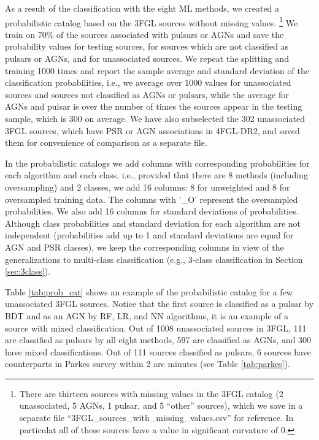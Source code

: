 As a result of the classification with the eight ML methods,
we created a probabilistic catalog based on the 3FGL sources without missing values.%
\footnote{There are thirteen sources with missing values in the 3FGL catalog (2 unassociated, 5 AGNs, 1 pulsar, and 5 ``other'' sources), 
which we save in a separate file ``3FGL\_sources\_with\_missing\_values.csv'' for reference. In particulat all of these sources have a value in significant curvature of 0.
}
We train on 70\% of the sources associated with pulsars or AGNs and save the probability values for testing sources, for sources which are not classified as pulsars or AGNs, and for unassociated sources.
We repeat the splitting and training 1000 times and report the sample average and standard deviation of the classification probabilities,
i.e., we average over 1000 values for unassociated sources and sources not classified as AGNs or pulsars, 
while the average for AGNs and pulsar is over the number of times the sources appear in the testing sample, which is 300 on average.
We have also subselected the 302 unassociated 3FGL sources, which have PSR or AGN associations in 4FGL-DR2,
and saved them for convenience of comparison as a separate file.

In the probabilistic catalogs we add columns with corresponding probabilities for each algorithm and each class,
i.e., provided that there are 8 methods (including oversampling) and 2 classes, we add 16 columns: 8 for unweighted and 8 for oversampled training data. The columns with '\_O' represent the oversampled probabilities. We also add 16 columns for standard deviations of probabilities. Although class probabilities and standard deviation for each algorithm are not independent (probabilities add up to 1 and standard deviations are equal for AGN and PSR classes), we keep the corresponding columns in view of the generalizations to multi-class classification (e.g., 3-class classification in Section \ref{sec:3class}).

Table \ref{tab:prob_cat} shows an example of the probabilistic catalog for a few unassociated 3FGL sources.
Notice that the first source is classified as a pulsar by BDT and as an AGN by RF, LR, and NN algorithms,
it is an example of a source with mixed classification.
Out of 1008 unassociated sources in 3FGL, 111 are classified as pulsars by all eight methods, 597 are classified as AGNs, and 300 have mixed classifications.
Out of 111 sources classified as pulsars, 6 sources have counterparts in Parkes survey \citep{Camilo2015} within 2 arc minutes (see Table \ref{tab:parkes}).


